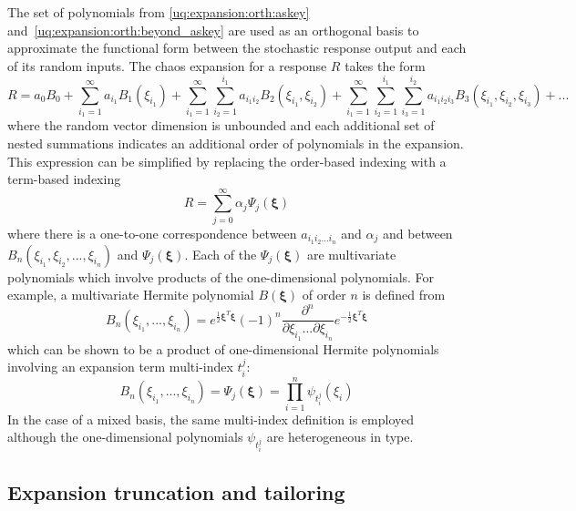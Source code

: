 The set of polynomials from \ref{uq:expansion:orth:askey}
and~\ref{uq:expansion:orth:beyond_askey} are used as an orthogonal basis to
approximate the functional form between the stochastic response output
and each of its random inputs.  The chaos expansion for a response $R$
takes the form
\begin{equation}
R = a_0 B_0 + \sum_{i_1=1}^{\infty} a_{i_1} B_1(\xi_{i_1}) + 
\sum_{i_1=1}^{\infty} \sum_{i_2=1}^{i_1} a_{i_1i_2} B_2(\xi_{i_1},\xi_{i_2}) +
\sum_{i_1=1}^{\infty} \sum_{i_2=1}^{i_1} \sum_{i_3=1}^{i_2} a_{i_1i_2i_3}
B_3(\xi_{i_1},\xi_{i_2},\xi_{i_3}) + ...\label{eq:expansion_long}
\end{equation}
where the random vector dimension is unbounded and each additional set
of nested summations indicates an additional order of polynomials in
the expansion.  This expression can be simplified by replacing the
order-based indexing with a term-based indexing
\begin{equation}
R = \sum_{j=0}^{\infty} \alpha_j \Psi_j(\boldsymbol{\xi})
\label{eq:expansion_short}
\end{equation}
where there is a one-to-one correspondence between $a_{i_1i_2...i_n}$
and $\alpha_j$ and between
$B_n(\xi_{i_1},\xi_{i_2},...,\xi_{i_n})$ and
$\Psi_j(\boldsymbol{\xi})$.  Each of the
$\Psi_j(\boldsymbol{\xi})$ are multivariate polynomials
which involve products of the one-dimensional polynomials.  For
example, a multivariate Hermite polynomial
$B(\boldsymbol{\xi})$ of order $n$ is defined from
\begin{equation}
B_n(\xi_{i_1}, ..., \xi_{i_n}) = 
e^{\frac{1}{2}\boldsymbol{\xi}^T\boldsymbol{\xi}} (-1)^n 
\frac{\partial^n}{\partial \xi_{i_1} ... \partial \xi_{i_n}} 
e^{-\frac{1}{2}\boldsymbol{\xi}^T\boldsymbol{\xi}} \label{eq:multivar_gen}
\end{equation}
which can be shown to be a product of one-dimensional Hermite polynomials
involving an expansion term multi-index $t_i^j$:
\begin{equation}
B_n(\xi_{i_1}, ..., \xi_{i_n}) = 
\Psi_j(\boldsymbol{\xi}) = 
\prod_{i=1}^{n} \psi_{t_i^j}(\xi_i) \label{eq:multivar_prod}
\end{equation}
In the case of a mixed basis, the same multi-index definition is
employed although the one-dimensional polynomials $\psi_{t_i^j}$ are
heterogeneous in type.

\subsection{Expansion truncation and tailoring} \label{uq:expansion:pce:exp_tnt}


